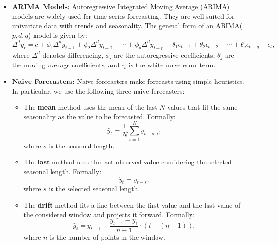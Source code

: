 \begin{itemize}
    \item \textbf{ARIMA Models:} Autoregressive Integrated Moving Average (ARIMA) models are widely used for time series forecasting. They are well-suited for univariate data with trends and seasonality. The general form of an ARIMA(\(p, d, q\)) model is given by:
    \begin{equation}
    \Delta^d y_t = c + \phi_1 \Delta^d y_{t-1} + \phi_2 \Delta^d y_{t-2} + \cdots + \phi_p \Delta^d y_{t-p} + \theta_1 \epsilon_{t-1} + \theta_2 \epsilon_{t-2} + \cdots + \theta_q \epsilon_{t-q} + \epsilon_t,
    \end{equation}
    where \(\Delta^d\) denotes differencing, \(\phi_i\) are the autoregressive coefficients, \(\theta_j\) are the moving average coefficients, and \(\epsilon_t\) is the white noise error term.
    
    \item \textbf{Naive Forecasters:} Naive forecasters make forecasts using simple heuristics. In particular, we use the following three naive forecasters:
    \begin{itemize}
        \item The \textbf{mean} method uses the mean of the last \(N\) values that fit the same seasonality as the value to be forecasted. Formally:
        \begin{equation}
            \hat{y}_t = \frac{1}{N} \sum_{i=1}^N y_{t-s \cdot i},
        \end{equation}
        where \(s\) is the seasonal length.
        \item The \textbf{last} method uses the last observed value considering the selected seasonal length. Formally:
        \begin{equation}
            \hat{y}_t = y_{t-s},
        \end{equation}
        where \(s\) is the selected seasonal length.
        \item The \textbf{drift} method fits a line between the first value and the last value of the considered window and projects it forward. Formally:
        \begin{equation}
            \hat{y}_t = y_{t-1} + \frac{y_{t-1} - y_1}{n-1} \cdot (t - (n-1)),
        \end{equation}
        where \(n\) is the number of points in the window.
    \end{itemize}


\end{itemize}
